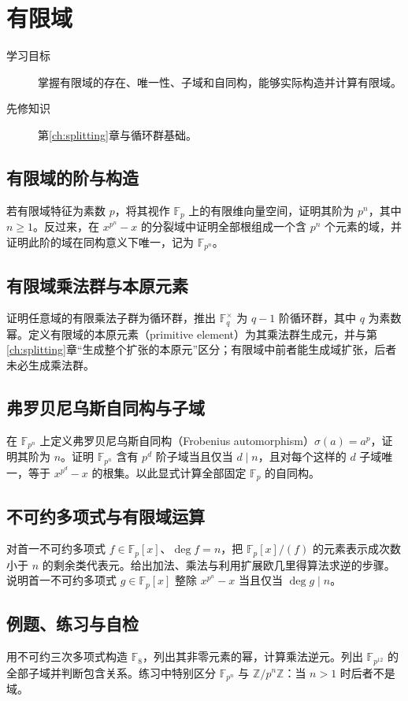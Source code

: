 \setcounter{chapter}{16} %
\chapter{有限域}\label{ch:finite-fields}

\begin{description}
  \item[学习目标] 掌握有限域的存在、唯一性、子域和自同构，能够实际构造并计算有限域。
  \item[先修知识] 第\ref{ch:splitting}章与循环群基础。
\end{description}

\section{有限域的阶与构造}
若有限域特征为素数 $p$，将其视作 $\mathbb F_p$ 上的有限维向量空间，证明其阶为 $p^n$，其中 $n\geq1$。反过来，在 $x^{p^n}-x$ 的分裂域中证明全部根组成一个含 $p^n$ 个元素的域，并证明此阶的域在同构意义下唯一，记为 $\mathbb F_{p^n}$。

\section{有限域乘法群与本原元素}
证明任意域的有限乘法子群为循环群，推出 $\mathbb F_q^\times$ 为 $q-1$ 阶循环群，其中 $q$ 为素数幂。定义有限域的本原元素（primitive element）为其乘法群生成元，并与第\ref{ch:splitting}章“生成整个扩张的本原元”区分；有限域中前者能生成域扩张，后者未必生成乘法群。

\section{弗罗贝尼乌斯自同构与子域}
在 $\mathbb F_{p^n}$ 上定义弗罗贝尼乌斯自同构（Frobenius automorphism）$\sigma(a)=a^p$，证明其阶为 $n$。证明 $\mathbb F_{p^n}$ 含有 $p^d$ 阶子域当且仅当 $d\mid n$，且对每个这样的 $d$ 子域唯一，等于 $x^{p^d}-x$ 的根集。以此显式计算全部固定 $\mathbb F_p$ 的自同构。

\section{不可约多项式与有限域运算}
对首一不可约多项式 $f\in\mathbb F_p[x]$、$\deg f=n$，把 $\mathbb F_p[x]/(f)$ 的元素表示成次数小于 $n$ 的剩余类代表元。给出加法、乘法与利用扩展欧几里得算法求逆的步骤。说明首一不可约多项式 $g\in\mathbb F_p[x]$ 整除 $x^{p^n}-x$ 当且仅当 $\deg g\mid n$。

\section{例题、练习与自检}
用不可约三次多项式构造 $\mathbb F_8$，列出其非零元素的幂，计算乘法逆元。列出 $\mathbb F_{p^{12}}$ 的全部子域并判断包含关系。练习中特别区分 $\mathbb F_{p^n}$ 与 $\mathbb Z/p^n\mathbb Z$：当 $n>1$ 时后者不是域。

